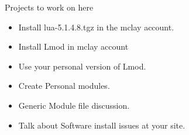 \documentclass{beamer}
\begin{document}
\begin{frame}{Projects to work on here}
  \begin{itemize}
    \item Install lua-5.1.4.8.tgz in the mclay account.
    \item Install Lmod in mclay account
    \item Use your personal version of Lmod.
    \item Create Personal modules.
    \item Generic Module file discussion.
    \item Talk about Software install issues at your site.
  \end{itemize}
\end{frame}
\end{document}
